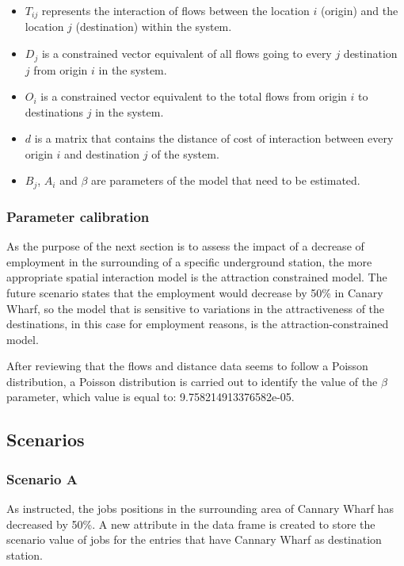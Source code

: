 \documentclass{article}
\begin{document}
\begin{itemize}
  \item $T_{ij}$ represents the interaction of flows between the location $i$ (origin) and the location $j$ (destination) within the system. 
  \item $D_{j}$ is a constrained vector equivalent of all flows going to every $j$ destination $j$ from origin $i$ in the system.
  \item $O_{i}$ is a constrained vector equivalent to the total flows from origin $i$ to destinations $j$ in the system.
    \item $d$ is a matrix that contains the distance of cost of interaction between every origin $i$ and destination $j$ of the system.
    \item $B_{j}$, $A_{i}$ and $\beta$ are parameters of the model that need to be estimated.
\end{itemize}


\subsubsection{Parameter calibration}

As the purpose of the next section is to assess the impact of a decrease of employment in the surrounding of a specific underground station, the more appropriate spatial interaction model is the attraction constrained model. The future scenario states that the employment would decrease by 50\% in Canary Wharf, so the model that is sensitive to variations in the attractiveness of the destinations, in this case for employment reasons, is the attraction-constrained model.

After reviewing that the flows and distance data seems to follow a Poisson distribution, a Poisson distribution is carried out to identify the value of the  $\beta$ parameter, which value is equal to: 9.758214913376582e-05.

\subsection{Scenarios}



\subsubsection{Scenario A}

As instructed, the jobs positions in the surrounding area of Cannary Wharf has decreased by 50\%. A new attribute in the data frame is created to store the scenario value of jobs for the entries that have Cannary Wharf as destination station. 
\end{document}
